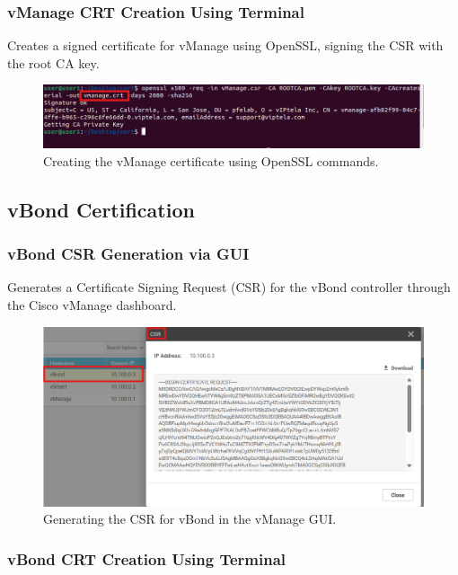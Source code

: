 \documentclass[12pt,english]{report}
\begin{document}
\subsubsection{vManage CRT Creation Using Terminal}

Creates a signed certificate for vManage using OpenSSL, signing the CSR with the root CA key.

\begin{figure}[H]
    \centering
    \includegraphics[width=1\textwidth]{appendix/vmanage-crt.png}
    \caption{Creating the vManage certificate using OpenSSL commands.}
    \label{fig:vmanage-crt}
\end{figure}

\subsection{vBond Certification}

\subsubsection{vBond CSR Generation via GUI}

Generates a Certificate Signing Request (CSR) for the vBond controller through the Cisco vManage dashboard.

\begin{figure}[H]
    \centering
    \includegraphics[width=1\textwidth]{appendix/vbond-csr.png}
    \caption{Generating the CSR for vBond in the vManage GUI.}
    \label{fig:vbond-csr}
\end{figure}

\subsubsection{vBond CRT Creation Using Terminal}
\end{document}

